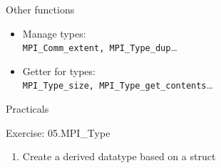 \documentclass[aspectratio=43]{beamer}
\begin{document}
\begin{frame}[fragile]{Other functions}
\begin{itemize}
    \item Manage types:\\\hspace{1cm}\verb+MPI_Comm_extent, MPI_Type_dup+\ldots
    \item Getter for types:\\\hspace{1cm}\verb+MPI_Type_size, MPI_Type_get_contents+\ldots
\end{itemize}
\end{frame}


\begin{frame}{Practicals}
    \begin{brown2block}{Exercise: 05.MPI\_Type}
    \begin{enumerate}
    \item Create a derived datatype based on a struct
    \end{enumerate}
    \end{brown2block}
\end{frame}



\end{document}
